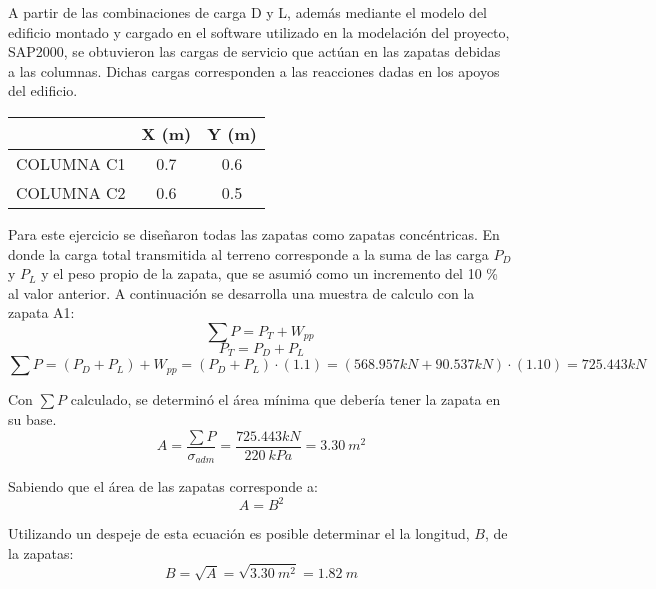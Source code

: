 \documentclass[12pt]{article}
\begin{document}
A partir de las combinaciones de carga D y L, además mediante el modelo del edificio montado y cargado en el software utilizado en la modelación del proyecto, SAP2000, se obtuvieron las cargas de servicio que actúan en las zapatas debidas a las columnas. Dichas cargas corresponden a las reacciones dadas en los apoyos del edificio.\\
\begin{table}[htbp]
  \centering
    \begin{tabular}{|c|c|c|}
    \hline
        & \textbf{X (m)} & \textbf{Y  (m)} \bigstrut\\
    \hline
    \cellcolor[rgb]{ .741,  .843,  .933} COLUMNA C1 & 0.7 & 0.6 \bigstrut\\
    \hline
    \cellcolor[rgb]{ .973,  .796,  .678}COLUMNA C2 & 0.6 & 0.5 \bigstrut\\
    \hline
    \end{tabular}%
  \label{tab:addlabel}%
\end{table}%

Para este ejercicio se diseñaron todas las zapatas como zapatas concéntricas. En donde la carga total transmitida al terreno corresponde a la suma de las carga $P_{D}$ y $P_{L}$ y el peso propio de la zapata, que se asumió como un incremento del 10 \% al valor anterior. A continuación se desarrolla una muestra de calculo con la zapata A1:
\begin{equation*}
    \sum P =P_{T}+W_{pp}
\end{equation*}
\begin{equation*}
    \ P_{T}=P_{D}+P_{L}
\end{equation*}
\begin{equation*}    
    \sum P =(P_{D}+P_{L})+W_{pp}=(P_{D}+P_{L})\cdot (1.1)=(568.957 kN+90.537 kN)\cdot (1.10)= 725.443 kN
\end{equation*}

Con $\sum P$ calculado, se determinó el área mínima que debería tener la zapata en su base.
\begin{equation*}
    \ A=\frac{\sum P}{\sigma_{adm}}=\frac{725.443 kN}{220~kPa}=3.30~m^2
\end{equation*}

Sabiendo que el área de las zapatas corresponde a:
\begin{equation*}
    \ A=B^2
\end{equation*}

Utilizando un despeje de esta ecuación es posible determinar el la longitud, $B$, de la zapatas:
\begin{equation*}
    \ B=\sqrt{A}=\sqrt{3.30~m^2}= 1.82~m
\end{equation*}
\end{document}
